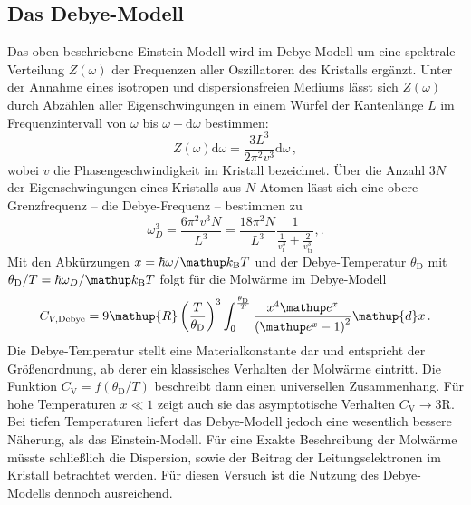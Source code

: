 \subsection{Das Debye-Modell}
\label{subsec:debye}
Das oben beschriebene Einstein-Modell wird im Debye-Modell um eine spektrale
Verteilung $Z(\omega)$ der Frequenzen aller Oszillatoren des Kristalls
ergänzt.
Unter der Annahme eines isotropen und dispersionsfreien Mediums lässt sich
$Z(\omega)$ durch Abzählen aller Eigenschwingungen in einem Würfel
der Kantenlänge $L$ im Frequenzintervall von $\omega$ bis
$\omega+\mathup{d}\omega$ bestimmen:
\begin{equation}
    \label{eqn:z}
    Z(\omega)\mathup{d}\omega = \frac{3L^3}{2\pi^2 v^3} \mathup{d}\omega\,,
\end{equation}
wobei $v$ die Phasengeschwindigkeit im Kristall bezeichnet.
Über die Anzahl $3N$ der Eigenschwingungen eines Kristalls aus $N$ Atomen
lässt sich eine obere Grenzfrequenz -- die Debye-Frequenz -- bestimmen zu
\begin{equation}
    \label{eqn:omega_debye}
    \omega_D^3 = \frac{6\pi^2 v^3 N}{L^3} = \frac{18 \pi^2 N}{L^3} \frac{1}{\frac{1}{v_\text{l}^3}+\frac{2}{v_\text{tr}^3}},.
\end{equation}
Mit den Abkürzungen $x = \hbar\omega/\kb T$ und der Debye-Temperatur
$\theta_\text{D}$ mit $\theta_\text{D}/T = \hbar\omega_D/\kb T$ folgt
für die Molwärme im Debye-Modell
\begin{equation}
    \label{eqn:cv_debye}
    C_{V,\text{Debye}} =
    9\mathup{R}\left(\frac{T}{\theta_\text{D}}\right)^3
    \int_0^{\frac{\theta_\text{D}}{T}}
    \frac{x^4\e^x}{\left(\e^x-1\right)^2}\mathup{d}x\,.
\end{equation}
Die Debye-Temperatur stellt eine Materialkonstante dar und entspricht der
Größenordnung, ab derer ein klassisches Verhalten der Molwärme eintritt.
Die Funktion $C_\mathrm{V} = f(\theta_\text{D}/T)$ beschreibt dann einen universellen
Zusammenhang. Für hohe Temperaturen $x \ll \num{1}$ zeigt auch sie das
asymptotische Verhalten $C_\mathrm{V}\to 3\mathup{R}$.
Bei tiefen Temperaturen liefert das Debye-Modell jedoch eine wesentlich
bessere Näherung, als das Einstein-Modell.
Für eine Exakte Beschreibung der Molwärme müsste schließlich die Dispersion,
sowie der Beitrag der Leitungselektronen im Kristall betrachtet werden.
Für diesen Versuch ist die Nutzung des Debye-Modells dennoch ausreichend.

